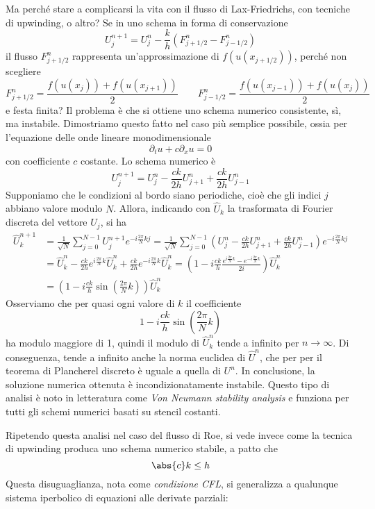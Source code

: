Ma perché stare a complicarsi la vita con il flusso di Lax-Friedrichs,
con tecniche di upwinding, o altro? Se in uno schema in forma di conservazione
\begin{equation} \label{eq:schema-forma-conservazione}
U_j^{n+1} = U_j^n - \frac{k}{h} (F_{j+1/2}^n - F_{j-1/2}^n)
\end{equation}
il flusso $F_{j+1/2}^n$ rappresenta un'approssimazione di
$f(u(x_{j+1/2}))$, perché non scegliere
\[
F_{j+1/2}^n = \frac{f(u(x_{j})) + f(u(x_{j+1}))}{2}
\qquad
F_{j-1/2}^n = \frac{f(u(x_{j-1})) + f(u(x_{j}))}{2}
\]
e festa finita? Il problema è che si ottiene uno schema numerico consistente,
sì, ma instabile. Dimostriamo questo fatto nel caso più semplice possibile,
ossia per l'equazione delle onde lineare monodimensionale
\[
\partial_t u + c \partial_x u = 0
\]
con coefficiente $c$ costante.
Lo schema numerico è
\[
U_j^{n+1} = U_j^n - \frac{ck}{2h} U_{j+1}^n + \frac{ck}{2h} U_{j-1}^n
\]
Supponiamo che le condizioni al bordo siano periodiche,
cioè che gli indici $j$ abbiano valore modulo $N$.
Allora, indicando con $\hat{U}_k$ la trasformata di Fourier discreta
del vettore $U_j$, si ha
\begin{align*}
\hat{U}^{n+1}_k
& = \frac{1}{\sqrt{N}} \sum_{j=0}^{N-1} U^{n+1}_j e^{-i \frac{2\pi}{N} kj}
  = \frac{1}{\sqrt{N}} \sum_{j=0}^{N-1} \left(
	U_j^n - \frac{ck}{2h} U_{j+1}^n + \frac{ck}{2h} U_{j-1}^n
	\right) e^{-i \frac{2\pi}{N} kj} \\
& = \hat{U}^n_k
  - \frac{ck}{2h} e^{i \frac{2\pi}{N} k} \hat{U}^n_k
  + \frac{ck}{2h} e^{-i \frac{2\pi}{N} k} \hat{U}^n_k
  = \left(1 - i \frac{ck}{h} \frac{e^{i \frac{2\pi}{N} k}
                                  -e^{-i \frac{2\pi}{N} k}}{2i}
    \right) \hat{U}^n_k \\
& = \left(1 - i \frac{ck}{h} \sin(\frac{2\pi}{N} k)
    \right) \hat{U}^n_k
\end{align*}
Osserviamo che per quasi ogni valore di $k$ il coefficiente
\[
1 - i \frac{ck}{h} \sin(\frac{2\pi}{N} k)
\]
ha modulo maggiore di 1, quindi il modulo di $\hat{U}^n_k$ tende
a infinito per $n \to \infty$. Di conseguenza, tende a infinito anche la norma
euclidea di $\hat{U}^n$, che per per il teorema di Plancherel discreto
è uguale a quella di $U^n$. In conclusione, la soluzione numerica ottenuta
è incondizionatamente instabile.
Questo tipo di analisi è noto in letteratura come \emph{Von Neumann stability analysis}
e funziona per tutti gli schemi numerici basati su stencil costanti.

Ripetendo questa analisi nel caso del flusso di Roe, si vede invece come
la tecnica di upwinding produca uno schema numerico stabile, a patto che
\[
\abs{c}k \leq h
\]
Questa disuguaglianza, nota come \emph{condizione CFL}, si generalizza
a qualunque sistema iperbolico di equazioni alle derivate parziali:

